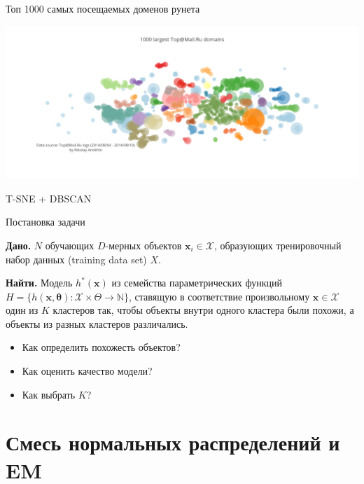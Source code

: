 \documentclass[10pt]{beamer}
\begin{document}
\begin{frame}{Топ 1000 самых посещаемых доменов рунета}

\begin{center}
\includegraphics[width=1.0\textwidth]{images/domains.png}
\end{center}
T-SNE + DBSCAN

\end{frame}

\begin{frame}{Постановка задачи}

{\bf Дано.} $N$ обучающих $D$-мерных объектов $\mathbf{x}_i \in \mathcal{X}$, образующих тренировочный набор данных (training data set) $X$.

\vspace{1em}
{\bf Найти.} Модель $h^*(\mathbf{x})$ из семейства параметрических функций $H = \{h(\mathbf{x, \mathbf{\theta}}): \mathcal{X} \times \Theta \rightarrow \mathbb{N}\}$, ставящую в соответствие произвольному $\mathbf{x} \in \mathcal{X}$ один из $K$ кластеров так, чтобы объекты внутри одного кластера были похожи, а объекты из разных кластеров различались.

\vspace{1em}
\begin{itemize}
\item Как определить похожесть объектов?
\item Как оценить качество модели?
\item Как выбрать $K$?
\end{itemize}

\end{frame}

\section{Смесь нормальных распределений и EM}
\end{document}

